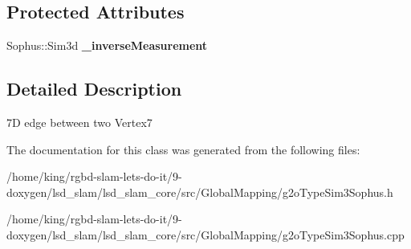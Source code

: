 \subsection*{Protected Attributes}
\begin{DoxyCompactItemize}
\item 
\hypertarget{classlsd__slam_1_1_edge_sim3_a22bd0dcc7b4465e069a0d12aa32e2ff4}{Sophus\-::\-Sim3d {\bfseries \-\_\-inverse\-Measurement}}\label{classlsd__slam_1_1_edge_sim3_a22bd0dcc7b4465e069a0d12aa32e2ff4}

\end{DoxyCompactItemize}


\subsection{Detailed Description}
7\-D edge between two Vertex7 

The documentation for this class was generated from the following files\-:\begin{DoxyCompactItemize}
\item 
/home/king/rgbd-\/slam-\/lets-\/do-\/it/9-\/doxygen/lsd\-\_\-slam/lsd\-\_\-slam\-\_\-core/src/\-Global\-Mapping/g2o\-Type\-Sim3\-Sophus.\-h\item 
/home/king/rgbd-\/slam-\/lets-\/do-\/it/9-\/doxygen/lsd\-\_\-slam/lsd\-\_\-slam\-\_\-core/src/\-Global\-Mapping/g2o\-Type\-Sim3\-Sophus.\-cpp\end{DoxyCompactItemize}
